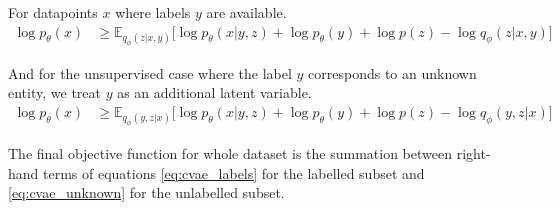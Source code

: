 For datapoints $x$ where labels $y$ are available.
\begin{align}
  \label{eq:cvae_labels}
  \log p_\theta(x) &\geq \mathbb{E}_{q_\phi(z|x,y)} \bigg[\log p_\theta(x|y,z) + \log p_\theta(y) + \log p(z) - \log q_\phi(z|x,y)\bigg]
\end{align}

And for the unsupervised case where the label $y$ corresponds to an unknown entity, we treat $y$ as an additional latent variable.
\begin{align}
  \label{eq:cvae_unknown}
  \log p_\theta(x) &\geq \mathbb{E}_{q_\phi(y,z|x)} \bigg[\log p_\theta(x|y,z) + \log p_\theta(y) + \log p(z) - \log q_\phi(y,z|x)\bigg]
\end{align}

The final objective function for whole dataset is the summation between right-hand terms of equations \ref{eq:cvae_labels} for the labelled subset and \ref{eq:cvae_unknown} for the unlabelled subset.

